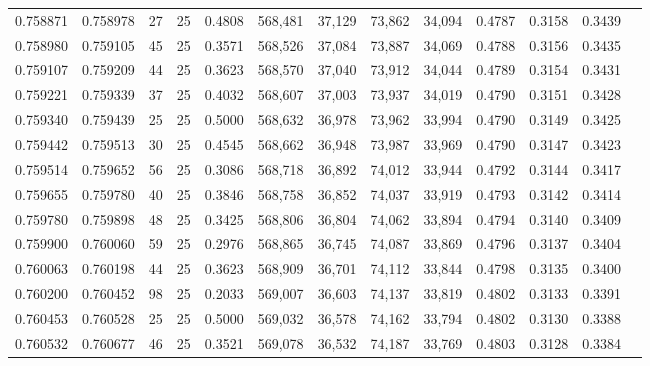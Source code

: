 \begin{tabular}{rrrrrrrrrrrrr}
0.758871 & 0.758978 &    27 &  25 &                                     0.4808 & 568,481 &  37,129 &  73,862 &  34,094 & 0.4787 & 0.3158 & 0.3439 \\
0.758980 & 0.759105 &    45 &  25 &                                     0.3571 & 568,526 &  37,084 &  73,887 &  34,069 & 0.4788 & 0.3156 & 0.3435 \\
0.759107 & 0.759209 &    44 &  25 &                                     0.3623 & 568,570 &  37,040 &  73,912 &  34,044 & 0.4789 & 0.3154 & 0.3431 \\
0.759221 & 0.759339 &    37 &  25 &                                     0.4032 & 568,607 &  37,003 &  73,937 &  34,019 & 0.4790 & 0.3151 & 0.3428 \\
0.759340 & 0.759439 &    25 &  25 &                                     0.5000 & 568,632 &  36,978 &  73,962 &  33,994 & 0.4790 & 0.3149 & 0.3425 \\
0.759442 & 0.759513 &    30 &  25 &                                     0.4545 & 568,662 &  36,948 &  73,987 &  33,969 & 0.4790 & 0.3147 & 0.3423 \\
0.759514 & 0.759652 &    56 &  25 &                                     0.3086 & 568,718 &  36,892 &  74,012 &  33,944 & 0.4792 & 0.3144 & 0.3417 \\
0.759655 & 0.759780 &    40 &  25 &                                     0.3846 & 568,758 &  36,852 &  74,037 &  33,919 & 0.4793 & 0.3142 & 0.3414 \\
0.759780 & 0.759898 &    48 &  25 &                                     0.3425 & 568,806 &  36,804 &  74,062 &  33,894 & 0.4794 & 0.3140 & 0.3409 \\
0.759900 & 0.760060 &    59 &  25 &                                     0.2976 & 568,865 &  36,745 &  74,087 &  33,869 & 0.4796 & 0.3137 & 0.3404 \\
0.760063 & 0.760198 &    44 &  25 &                                     0.3623 & 568,909 &  36,701 &  74,112 &  33,844 & 0.4798 & 0.3135 & 0.3400 \\
0.760200 & 0.760452 &    98 &  25 &                                     0.2033 & 569,007 &  36,603 &  74,137 &  33,819 & 0.4802 & 0.3133 & 0.3391 \\
0.760453 & 0.760528 &    25 &  25 &                                     0.5000 & 569,032 &  36,578 &  74,162 &  33,794 & 0.4802 & 0.3130 & 0.3388 \\
0.760532 & 0.760677 &    46 &  25 &                                     0.3521 & 569,078 &  36,532 &  74,187 &  33,769 & 0.4803 & 0.3128 & 0.3384 \\

\end{tabular}
